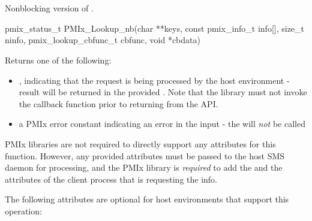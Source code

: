 \section{}

\summary

Nonblocking version of .

\format

\cspecificstart
\begin{codepar}
pmix_status_t
PMIx_Lookup_nb(char **keys,
               const pmix_info_t info[], size_t ninfo,
               pmix_lookup_cbfunc_t cbfunc, void *cbdata)
\end{codepar}
\cspecificend

\begin{arglist}
\end{arglist}

Returns one of the following:

\begin{itemize}
    \item {}, indicating that the request is being processed by the host environment - result will be returned in the provided . Note that the library must not invoke the callback function prior to returning from the \ac{API}.
    \item a PMIx error constant indicating an error in the input - the  will \textit{not} be called
\end{itemize}


\reqattrstart
\ac{PMIx} libraries are not required to directly support any attributes for this function. However, any provided attributes must be passed to the host \ac{SMS} daemon for processing, and the \ac{PMIx} library is \textit{required} to add the  and the  attributes of the client process that is requesting the info.

\reqattrend

\optattrstart
The following attributes are optional for host environments that support this operation:

